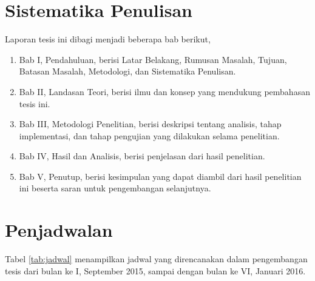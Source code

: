 \documentclass[12pt,a4paper,titlepage]{article}
\begin{document}

\section{Sistematika Penulisan}\label{sec:sistematika-penulisan}

Laporan tesis ini dibagi menjadi beberapa bab berikut,
\begin{enumerate}
	\item Bab I, Pendahuluan, berisi Latar Belakang, Rumusan Masalah, Tujuan, Batasan Masalah, Metodologi, dan Sistematika Penulisan.
	\item Bab II, Landasan Teori, berisi ilmu dan konsep yang mendukung pembahasan tesis ini.
	\item Bab III, Metodologi Penelitian, berisi deskripsi tentang analisis, tahap implementasi, dan tahap pengujian yang dilakukan selama penelitian.
	\item Bab IV, Hasil dan Analisis, berisi penjelasan dari hasil penelitian.
	\item Bab V, Penutup, berisi kesimpulan yang dapat diambil dari hasil penelitian ini beserta saran untuk pengembangan selanjutnya.
\end{enumerate}

\clearpage
\section{Penjadwalan}\label{sec:penjadwalan}

Tabel \ref{tab:jadwal} menampilkan jadwal yang direncanakan dalam pengembangan tesis dari bulan ke I, September 2015, sampai dengan bulan ke VI, Januari 2016.

\renewcommand{\arraystretch}{1.5}
\setlength{\tabcolsep}{3pt}
\newcommand{\tand}{&}
\newcommand{\fillcell}[1]{%
	\forloop{cnt}{0}{\value{cnt}<#1}{%
		{\cellcolor[gray]{0.7}} \tand
	}%
}
\newcommand{\emptycell}[2]{%
	\forloop{cnt}{0}{\value{cnt}<#1}{%
		\tand
	}%
	\ifthenelse{#2 = 1}{\\}{\tand}%
}
\end{document}
